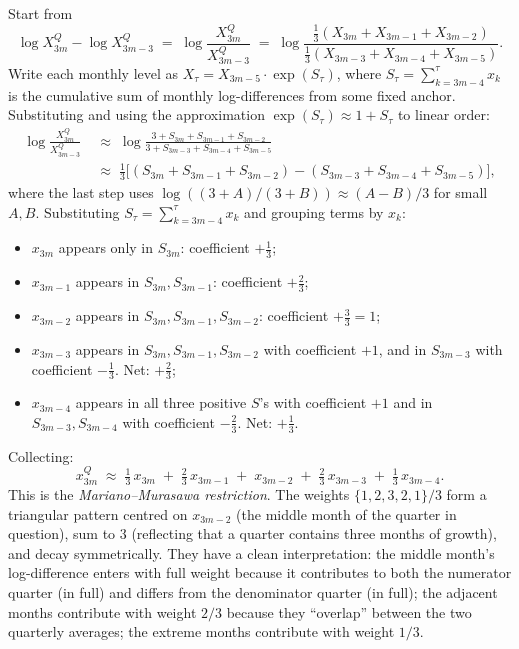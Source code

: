 \documentclass[11pt, a4paper, oneside]{article}
\begin{document}
Start from
\[
\log X^Q_{3m} - \log X^Q_{3m-3} \;=\; \log\!\frac{X^Q_{3m}}{X^Q_{3m-3}}
\;=\; \log\!\frac{\tfrac{1}{3}(X_{3m} + X_{3m-1} + X_{3m-2})}{\tfrac{1}{3}(X_{3m-3} + X_{3m-4} + X_{3m-5})}.
\]
Write each monthly level as $X_\tau = X_{3m-5} \cdot \exp(S_\tau)$, where
$S_\tau = \sum_{k = 3m-4}^{\tau} x_k$ is the cumulative sum of monthly
log-differences from some fixed anchor. Substituting and using the
approximation $\exp(S_\tau) \approx 1 + S_\tau$ to linear order:
\begin{align*}
\log\!\frac{X^Q_{3m}}{X^Q_{3m-3}}
&\;\approx\; \log\!\frac{3 + S_{3m} + S_{3m-1} + S_{3m-2}}{3 + S_{3m-3} + S_{3m-4} + S_{3m-5}} \\[4pt]
&\;\approx\; \tfrac{1}{3}\big[(S_{3m} + S_{3m-1} + S_{3m-2}) - (S_{3m-3} + S_{3m-4} + S_{3m-5})\big],
\end{align*}
where the last step uses $\log((3 + A)/(3 + B)) \approx (A - B)/3$ for
small $A, B$. Substituting $S_\tau = \sum_{k = 3m-4}^\tau x_k$ and
grouping terms by $x_k$:

\begin{itemize}[leftmargin=1.5em, itemsep=2pt]
    \item $x_{3m}$ appears only in $S_{3m}$: coefficient $+\tfrac{1}{3}$;
    \item $x_{3m-1}$ appears in $S_{3m}, S_{3m-1}$: coefficient $+\tfrac{2}{3}$;
    \item $x_{3m-2}$ appears in $S_{3m}, S_{3m-1}, S_{3m-2}$: coefficient $+\tfrac{3}{3} = 1$;
    \item $x_{3m-3}$ appears in $S_{3m}, S_{3m-1}, S_{3m-2}$ with coefficient $+1$,
          and in $S_{3m-3}$ with coefficient $-\tfrac{1}{3}$. Net: $+\tfrac{2}{3}$;
    \item $x_{3m-4}$ appears in all three positive $S$'s with coefficient
          $+1$ and in $S_{3m-3}, S_{3m-4}$ with coefficient $-\tfrac{2}{3}$.
          Net: $+\tfrac{1}{3}$.
\end{itemize}
Collecting:
\begin{equation}
\boxed{\;\;
x^Q_{3m} \;\approx\; \tfrac{1}{3}\, x_{3m} \;+\; \tfrac{2}{3}\, x_{3m-1} \;+\; x_{3m-2} \;+\; \tfrac{2}{3}\, x_{3m-3} \;+\; \tfrac{1}{3}\, x_{3m-4}.
\;\;}
\label{eq:mm-aggregation}
\end{equation}
This is the \emph{Mariano–Murasawa restriction}. The weights
$\{1, 2, 3, 2, 1\}/3$ form a triangular pattern centred on
$x_{3m-2}$ (the middle month of the quarter in question), sum to $3$
(reflecting that a quarter contains three months of growth), and
decay symmetrically. They have a clean interpretation: the middle
month's log-difference enters with full weight because it contributes
to both the numerator quarter (in full) and differs from the
denominator quarter (in full); the adjacent months contribute with
weight $2/3$ because they ``overlap'' between the two quarterly
averages; the extreme months contribute with weight $1/3$.
\end{document}
